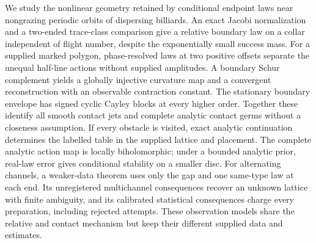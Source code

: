 We study the nonlinear geometry retained by conditional endpoint laws
near nongrazing periodic orbits of dispersing billiards.  An exact Jacobi
normalization and a two-ended trace-class comparison give a relative
boundary law on a collar independent of flight number, despite the
exponentially small success mass.  For a supplied marked polygon,
phase-resolved laws at two positive offsets separate the unequal
half-line actions without supplied amplitudes.  A boundary Schur
complement yields a globally injective curvature map and a convergent
reconstruction with an observable contraction constant.  The stationary
boundary envelope has signed cyclic Cayley blocks at every higher order.
Together these identify all smooth contact jets and complete analytic
contact germs without a closeness assumption.  If every obstacle is
visited, exact analytic continuation determines the labelled table in
the supplied lattice and placement.  The complete analytic action map
is locally biholomorphic; under a bounded analytic prior, real-law error
gives conditional stability on a smaller disc.  For alternating channels, a weaker-data theorem uses only the gap and
one same-type law at each end.  Its unregistered multichannel
consequences recover an unknown lattice with finite ambiguity, and its
calibrated statistical consequences charge every preparation, including
rejected attempts.  These observation models share the relative and
contact mechanism but keep their different supplied data and estimates.
